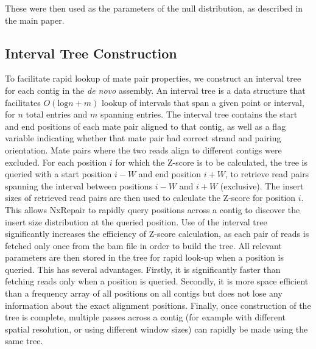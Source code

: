 \documentclass[fleqn,10pt]{wlpeerj}
\begin{document}
These were then used as the parameters of the null distribution, as described in the main paper.

\subsection*{Interval Tree Construction}
To facilitate rapid lookup of mate pair properties, we construct an interval tree~\citep{cormen2009} for each contig in the \textit{de novo} assembly. An interval tree is a data structure that facilitates $O(\text{log} n + m)$ lookup of intervals that span a given point or interval, for $n$ total entries and $m$ spanning entries. The interval tree contains the start and end positions of each mate pair aligned to that contig, as well as a flag variable indicating whether that mate pair had correct strand and pairing orientation. Mate pairs where the two reads align to different contigs were excluded. For each position $i$ for which the Z-score is to be calculated, the tree is queried with a start position $i-W$ and end position $i+W$, to retrieve read pairs spanning the interval between positions $i-W$ and $i+W$ (exclusive). The insert sizes of retrieved read pairs are then used to calculate the Z-score for position $i$. This allows NxRepair to rapidly query positions across a contig to discover the insert size distribution at the queried position. Use of the interval tree significantly increases the efficiency of Z-score calculation, as each pair of reads is fetched only once from the bam file in order to build the tree. All relevant parameters are then stored in the tree for rapid look-up when a position is queried. This has several advantages. Firstly, it is significantly faster than fetching reads only when a position is queried. Secondly, it is more space efficient than a frequency array of all positions on all contigs but does not lose any information about the exact alignment positions. Finally, once construction of the tree is complete, multiple passes across a contig (for example with different spatial resolution, or using different window sizes) can rapidly be made using the same tree.      
\end{document}
